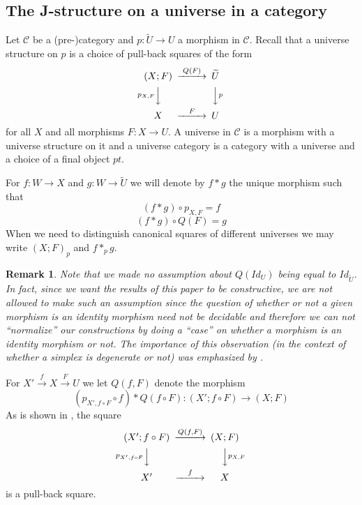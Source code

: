 \documentclass[12pt]{article}
\newenvironment{eq}{\begin{equation}}{\end{equation}}
\newtheorem{remark}[proposition]{Remark}
\newcommand{\llabel}[1]{\label{#1}}
\newcommand{\sr}{\rightarrow}
\newcommand{\wt}{\widetilde}
\begin{document}
\subsection{The J-structure on a universe in a category}
%
Let $\mathcal C$ be a (pre-)category and $p:\wt{U}\sr U$ a morphism in $\mathcal C$. Recall that a universe structure on $p$ is a choice of pull-back squares of the form
%
$$
\begin{CD}
(X;F) @>Q(F)>> \wt{U}\\
@Vp_{X,F} VV @VV p V\\
X @>F>> U
\end{CD}
$$
%
for all $X$ and all morphisms $F:X\sr U$. A universe in $\mathcal C$ is a morphism with a universe structure on it and a universe category is a category with a universe and a choice of a final object $pt$.  

For $f:W\sr X$ and $g:W\sr \wt{U}$ we will denote by $f*g$ the unique morphism such that 
%
$$(f*g)\circ p_{X,F}=f$$
$$(f*g)\circ Q(F)=g$$
%
When we need to distinguish canonical squares of different universes we may write $(X;F)_{p}$ and $f*_p g$.
%
\begin{remark}\rm
\llabel{2015.03.29.rm1}
Note that we made no assumption about $Q(Id_U)$ being equal to $Id_{\wt{U}}$. In fact, since we want the results of this paper to be constructive, we are not allowed to make such an assumption since the question of whether or not a given morphism is an identity morphism need not be decidable and therefore we can not ``normalize'' our constructions by doing a ``case'' on whether a morphism is an identity morphism or not. The importance of this observation (in the context of whether a simplex is degenerate or not) was emphasized by \cite{BCH}.
\end{remark}
%
For $X'\stackrel{f}{\sr}X\stackrel{F}{\sr}U$ we let $Q(f,F)$ denote the morphism 
%
$$(p_{X',f\circ F}\circ f)*Q(f\circ F):(X';f\circ F)\sr (X;F)$$
%
As is shown in \cite{fromunivwithPi}, the square
%
\begin{eq}
\llabel{2015.04.06.l0.sq}
\begin{CD}
(X';f\circ F) @>Q(f,F)>> (X;F)\\
@Vp_{X',f\circ F} VV @VVp_{X,F}V\\
X' @>f>> X
\end{CD}
\end{eq}
%
is a pull-back square.
\end{document}
